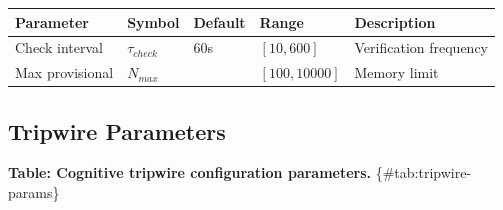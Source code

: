\documentclass[
]{article}
\newcounter{none} %
\begin{document}
{\def\LTcaptype{none} %
\begin{longtable}[]{@{}
  >{\raggedright\arraybackslash}p{}
  >{\raggedright\arraybackslash}p{}
  >{\raggedright\arraybackslash}p{}
  >{\raggedright\arraybackslash}p{}
  >{\raggedright\arraybackslash}p{}@{}}
\toprule\noalign{}
\begin{minipage}[b]{\linewidth}\raggedright
Parameter
\end{minipage} & \begin{minipage}[b]{\linewidth}\raggedright
Symbol
\end{minipage} & \begin{minipage}[b]{\linewidth}\raggedright
Default
\end{minipage} & \begin{minipage}[b]{\linewidth}\raggedright
Range
\end{minipage} & \begin{minipage}[b]{\linewidth}\raggedright
Description
\end{minipage} \\
\midrule\noalign{}
\endhead
\bottomrule\noalign{}
\endlastfoot
Check interval & \(\tau_{check}\) & 60s & \([10, 600]\) & Verification
frequency \\
Max provisional & \(N_{max}\) & 1000 & \([100, 10000]\) & Memory
limit \\
\end{longtable}
}

\subsection{Tripwire Parameters}\label{sec:tripwire-params}

\textbf{Table: Cognitive tripwire configuration parameters.}
\{\#tab:tripwire-params\}
\end{document}
